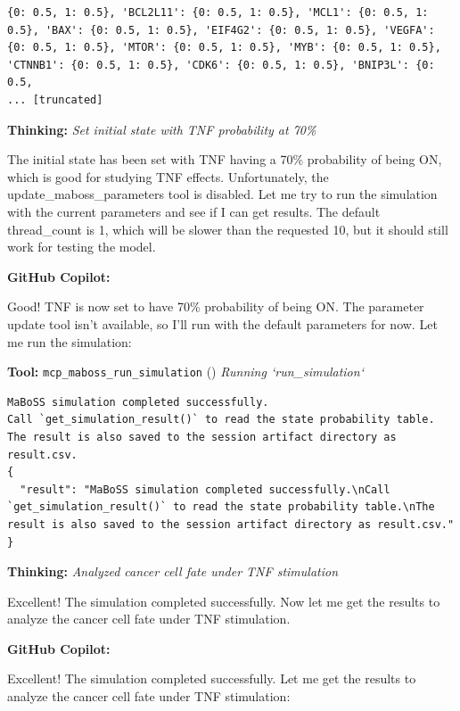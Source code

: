 \documentclass[11pt,a4paper]{article}
\begin{document}
\begin{toolokbox}
\begin{lstlisting}
{0: 0.5, 1: 0.5}, 'BCL2L11': {0: 0.5, 1: 0.5}, 'MCL1': {0: 0.5, 1: 0.5}, 'BAX': {0: 0.5, 1: 0.5}, 'EIF4G2': {0: 0.5, 1: 0.5}, 'VEGFA': {0: 0.5, 1: 0.5}, 'MTOR': {0: 0.5, 1: 0.5}, 'MYB': {0: 0.5, 1: 0.5}, 'CTNNB1': {0: 0.5, 1: 0.5}, 'CDK6': {0: 0.5, 1: 0.5}, 'BNIP3L': {0: 0.5,
... [truncated]
\end{lstlisting}
\end{toolokbox}
\begin{thinkbox}
\textbf{Thinking:} \textit{Set initial state with TNF probability at 70\%}

The initial state has been set with TNF having a 70\% probability of being ON, which is good for studying TNF effects. Unfortunately, the update\_maboss\_parameters tool is disabled. Let me try to run the simulation with the current parameters and see if I can get results. The default thread\_count is 1, which will be slower than the requested 10, but it should still work for testing the model.

\end{thinkbox}
\begin{copilotbox}
\textbf{GitHub Copilot:}

Good! TNF is now set to have 70\% probability of being ON. The parameter update tool isn't available, so I'll run with the default parameters for now. Let me run the simulation:

\end{copilotbox}
\begin{toolokbox}
\textbf{Tool:} \texttt{mcp\_maboss\_run\_simulation} (\checkmark)
\textit{Running `run\_simulation`}
\begin{lstlisting}
MaBoSS simulation completed successfully.
Call `get_simulation_result()` to read the state probability table.
The result is also saved to the session artifact directory as result.csv.
{
  "result": "MaBoSS simulation completed successfully.\nCall `get_simulation_result()` to read the state probability table.\nThe result is also saved to the session artifact directory as result.csv."
}
\end{lstlisting}
\end{toolokbox}
\begin{thinkbox}
\textbf{Thinking:} \textit{Analyzed cancer cell fate under TNF stimulation}

Excellent! The simulation completed successfully. Now let me get the results to analyze the cancer cell fate under TNF stimulation.

\end{thinkbox}
\begin{copilotbox}
\textbf{GitHub Copilot:}

Excellent! The simulation completed successfully. Let me get the results to analyze the cancer cell fate under TNF stimulation:

\end{copilotbox}
\end{document}
